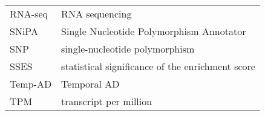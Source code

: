 \begin{table}[!ht]
\begin{tabular}{ll}
RNA-seq    & RNA sequencing                           \\
SNiPA      & Single Nucleotide Polymorphism Annotator \\
SNP        & single-nucleotide polymorphism           \\
SSES                          & statistical significance of the enrichment score                           \\
Temp-AD    & Temporal AD                              \\
TPM        & transcript per million                   \\ \bottomrule
\end{tabular}
\end{table}